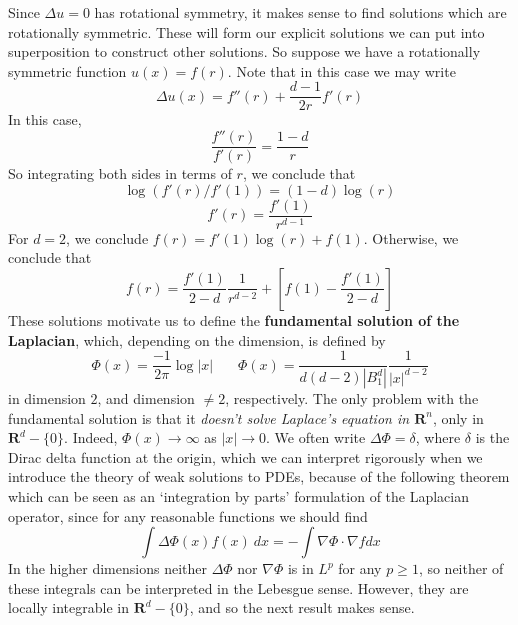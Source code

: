 Since $\Delta u = 0$ has rotational symmetry, it makes sense to find solutions which are rotationally symmetric. These will form our explicit solutions we can put into superposition to construct other solutions. So suppose we have a rotationally symmetric function $u(x) = f(r)$. Note that in this case we may write
%
\[ \Delta u(x) = f''(r) + \frac{d - 1}{2r} f'(r) \]
%
In this case,
%
\[ \frac{f''(r)}{f'(r)} = \frac{1 - d}{r} \]
%
So integrating both sides in terms of $r$, we conclude that
%
\[ \log(f'(r)/f'(1)) = (1 - d) \log(r) \]
\[ f'(r) = \frac{f'(1)}{r^{d-1}} \]
%
For $d = 2$, we conclude $f(r) = f'(1) \log(r) + f(1)$. Otherwise, we conclude that
%
\[ f(r) = \frac{f'(1)}{2 - d} \frac{1}{r^{d-2}} + \left[ f(1) - \frac{f'(1)}{2 - d} \right] \]
%
These solutions motivate us to define the {\bf fundamental solution of the Laplacian}, which, depending on the dimension, is defined by
%
\[ \Phi(x) = \frac{-1}{2 \pi} \log |x|\ \ \ \ \ \ \ \ \Phi(x) = \frac{1}{d(d-2) |B^d_1|} \frac{1}{|x|^{d-2}} \]
%
in dimension $2$, and dimension $\neq 2$, respectively.
%
The only problem with the fundamental solution is that it {\it doesn't solve Laplace's equation in $\mathbf{R}^n$}, only in $\mathbf{R}^d - \{ 0 \}$. Indeed, $\Phi(x) \to \infty$ as $|x| \to 0$. We often write $\Delta \Phi = \delta$, where $\delta$ is the Dirac delta function at the origin, which we can interpret rigorously when we introduce the theory of weak solutions to PDEs, because of the following theorem which can be seen as an `integration by parts' formulation of the Laplacian operator, since for any reasonable functions we should find
%
\[ \int \Delta \Phi(x) f(x)\ dx = - \int \nabla \Phi \cdot \nabla f dx \]
%
In the higher dimensions neither $\Delta \Phi$ nor $\nabla \Phi$ is in $L^p$ for any $p \geq 1$, so neither of these integrals can be interpreted in the Lebesgue sense. However, they are locally integrable in $\mathbf{R}^d - \{ 0 \}$, and so the next result makes sense.

